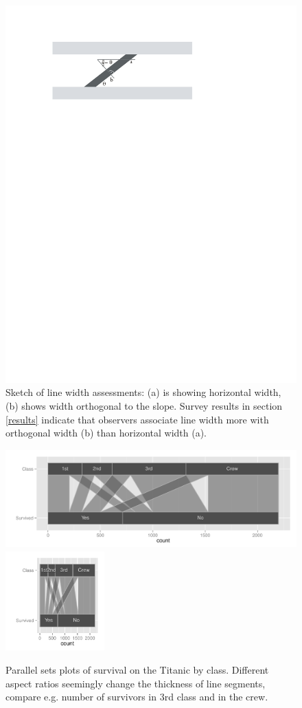 \begin{figure}[htbp]
\begin{center}
\includegraphics[width=0.6\linewidth]{images/linewidth}
\end{center}
\caption{\label{fig:linewidth}Sketch of line width assessments: (a) is showing  horizontal width, (b) shows  width orthogonal to the slope. Survey results in section \ref{results}  indicate that observers associate line width more with  orthogonal width (b) than horizontal width (a).}
\end{figure}





\begin{figure}[htbp]
\begin{center}
\includegraphics[height=1.5in]{images/aspect31-titanic.pdf}
\includegraphics[height=1.5in]{images/aspect33-titanic.pdf}
\end{center}
\caption{\label{fig:aspect}Parallel sets plots of survival on the Titanic by class. Different aspect ratios  seemingly change the thickness of line segments, compare e.g. number of survivors in 3rd class and in the crew. }
\end{figure}



